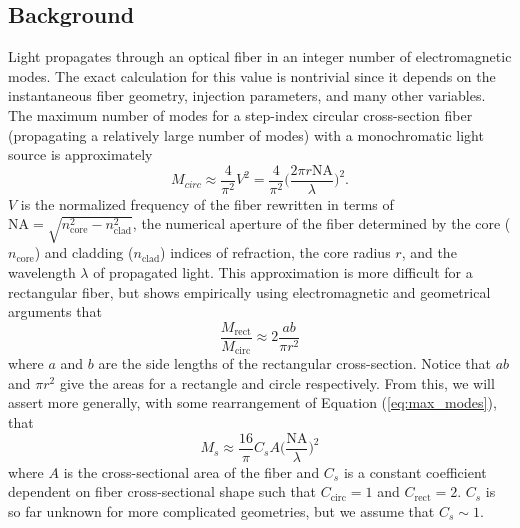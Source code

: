 \documentclass[11pt]{article}
\begin{document}
\subsection{Background}
\label{subsec:modal_noise_intro}

Light propagates through an optical fiber in an integer number of electromagnetic modes. The exact calculation for this value is nontrivial since it depends on the instantaneous fiber geometry, injection parameters, and many other variables. The maximum number of modes for a step-index circular cross-section fiber (propagating a relatively large number of modes) with a monochromatic light source is approximately
\begin{equation}
M_{circ} \approx \frac{4}{\pi ^2} V^2 = \frac{4}{\pi ^2} \Bigg( \frac{2 \pi r \mathrm{NA}}{\lambda} \Bigg) ^2.
\label{eq:max_modes}
\end{equation}
$V$ is the normalized frequency of the fiber rewritten in terms of $\mathrm{NA} = \sqrt{n_\mathrm{core}^2 - n_\mathrm{clad}^2}$, the numerical aperture of the fiber determined by the core ($n_\mathrm{core}$) and cladding ($n_\mathrm{clad}$) indices of refraction, the core radius $r$, and the wavelength $\lambda$ of propagated light. This approximation is more difficult for a rectangular fiber, but \citet{Nikitin2011} shows empirically using electromagnetic and geometrical arguments that
\begin{equation}
\frac{M_\mathrm{rect}}{M_\mathrm{circ}} \approx 2 \frac{ab}{\pi r^2}
\label{eq:prop_modes}
\end{equation}
where $a$ and $b$ are the side lengths of the rectangular cross-section. Notice that $ab$ and $\pi r^2$ give the areas for a rectangle and circle respectively. From this, we will assert more generally, with some rearrangement of Equation (\ref{eq:max_modes}), that
\begin{equation}
M_{s} \approx \frac{16}{\pi} C_{s} A \Bigg( \frac{\mathrm{NA}}{\lambda} \Bigg) ^2
\label{eq:mode_area}
\end{equation}
where $A$ is the cross-sectional area of the fiber and $C_{s}$ is a constant coefficient dependent on fiber cross-sectional shape such that $C_\mathrm{circ} = 1$ and $C_\mathrm{rect} = 2$. $C_{s}$ is so far unknown for more complicated geometries, but we assume that $C_{s} \sim 1$.
\end{document}
